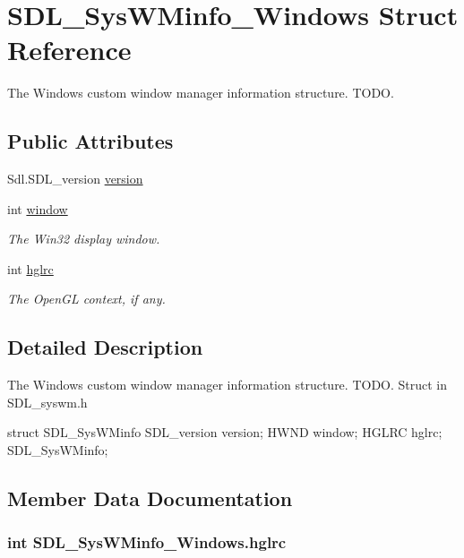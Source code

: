 \hypertarget{struct_s_d_l___sys_w_minfo___windows}{
\section{SDL\_\-SysWMinfo\_\-Windows Struct Reference}
\label{struct_s_d_l___sys_w_minfo___windows}
}


The Windows custom window manager information structure. TODO.  


\subsection*{Public Attributes}
\begin{DoxyCompactItemize}
\item 
Sdl.SDL\_\-version \hyperlink{struct_s_d_l___sys_w_minfo___windows_a4c0d9ab91c33f975d8823b3b4729a69e}{version}
\item 
int \hyperlink{struct_s_d_l___sys_w_minfo___windows_a5a3997fe4f0228693a99ddc2dd6817b1}{window}
\begin{DoxyCompactList}\small\item\em The Win32 display window. \item\end{DoxyCompactList}\item 
int \hyperlink{struct_s_d_l___sys_w_minfo___windows_ac92281e90b547777579e0b972b4446c5}{hglrc}
\begin{DoxyCompactList}\small\item\em The OpenGL context, if any. \item\end{DoxyCompactList}\end{DoxyCompactItemize}


\subsection{Detailed Description}
The Windows custom window manager information structure. TODO. Struct in SDL\_\-syswm.h 
\begin{DoxyCode}
            struct SDL_SysWMinfo {
                SDL_version version;
                HWND window;
                HGLRC hglrc;
            } SDL_SysWMinfo;            
\end{DoxyCode}
  

\subsection{Member Data Documentation}
\hypertarget{struct_s_d_l___sys_w_minfo___windows_ac92281e90b547777579e0b972b4446c5}{
\subsubsection[{hglrc}]{\setlength{\rightskip}{0pt plus 5cm}int {\bf SDL\_\-SysWMinfo\_\-Windows.hglrc}}}
\label{struct_s_d_l___sys_w_minfo___windows_ac92281e90b547777579e0b972b4446c5}


